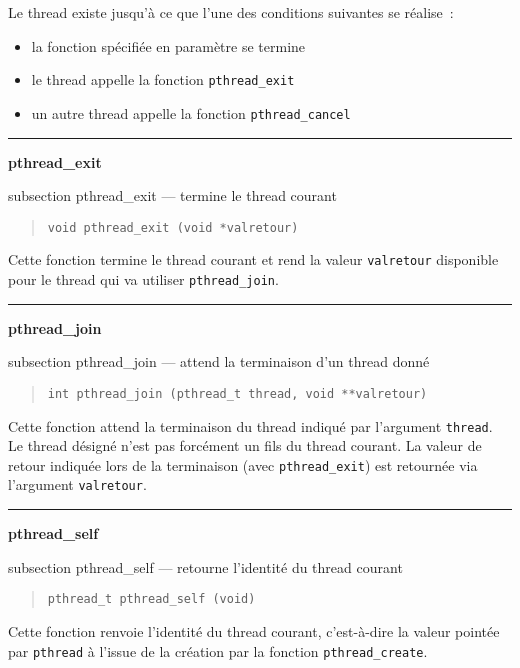 \documentclass [twoside] {report}
\newcommand {\primitive} [1]
    {
	{\large \bf #1}
	\addcontentsline {toc} {subsection} {#1}
    }
\newcommand {\separation}
    {
	\vspace {7mm}
	\nopagebreak
	\hrule
    }
\begin{document}
Le thread existe jusqu'à ce que l'une des conditions suivantes se
réalise~:

\begin {itemize}
    \item la fonction spécifiée en paramètre se termine
    \item le thread appelle la fonction \texttt {pthread\_exit}
    \item un autre thread appelle la fonction \texttt {pthread\_cancel}
\end {itemize}


\separation 
\primitive {pthread\_exit} --- termine le thread courant

\begin {quote}
\begin {verbatim}
void pthread_exit (void *valretour)
\end{verbatim}
\end {quote}

Cette fonction termine le thread courant et rend la valeur \texttt
{valretour} disponible pour le thread qui va utiliser \verb|pthread_join|.


\separation 
\primitive {pthread\_join} --- attend la terminaison d'un thread donné

\begin {quote}
\begin {verbatim}
int pthread_join (pthread_t thread, void **valretour)
\end{verbatim}
\end {quote}

Cette fonction attend la terminaison du thread indiqué par l'argument
\texttt {thread}. Le thread désigné n'est pas forcément un fils du
thread courant. La valeur de retour indiquée lors de la terminaison (avec
\verb|pthread_exit|) est retournée via l'argument \texttt {valretour}.


\separation 
\primitive {pthread\_self} --- retourne l'identité du thread courant

\begin {quote}
\begin {verbatim}
pthread_t pthread_self (void)
\end{verbatim}
\end {quote}

Cette fonction renvoie l'identité du thread courant, c'est-à-dire la
valeur pointée par \texttt {pthread} à l'issue de la création par
la fonction \verb|pthread_create|.
\end{document}
